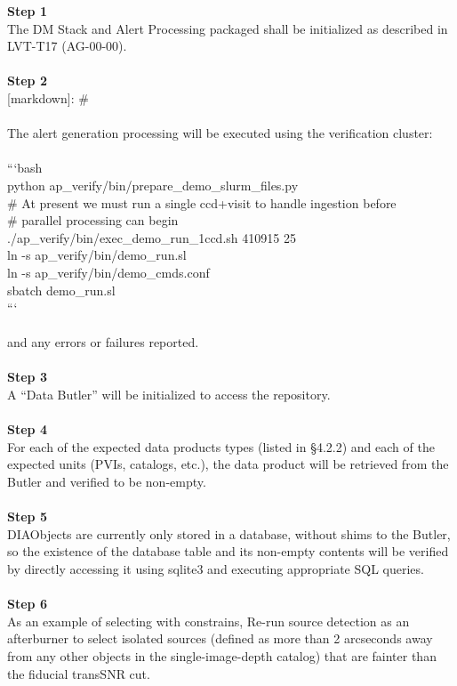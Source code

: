 \textbf{Step 1}\\
The DM Stack and Alert Processing packaged shall be initialized as
described in LVT-T17 (AG-00-00).\\
~\\
\textbf{Step 2}\\
{[}markdown{]}: \#\\
~\\
The alert generation processing will be executed using the verification
cluster:\\
~\\
```bash\\
python ap\_verify/bin/prepare\_demo\_slurm\_files.py\\
\# At present we must run a single ccd+visit to handle ingestion
before\\
\# parallel processing can begin\\
./ap\_verify/bin/exec\_demo\_run\_1ccd.sh 410915 25\\
ln -s ap\_verify/bin/demo\_run.sl\\
ln -s ap\_verify/bin/demo\_cmds.conf\\
sbatch demo\_run.sl\\
```\\
~\\
and any errors or failures reported.\\
~\\
\textbf{Step 3}\\
A ``Data Butler'' will be initialized to access the repository.\\
~\\
\textbf{Step 4}\\
For each of the expected data products types (listed in §4.2.2) and each
of the expected units (PVIs, catalogs, etc.), the data product will be
retrieved from the Butler and verified to be non-empty.\\
~\\
\textbf{Step 5}\\
DIAObjects are currently only stored in a database, without shims to the
Butler, so the existence of the database table and its non-empty
contents will be verified by directly accessing it using sqlite3 and
executing appropriate SQL queries.\\
~\\
\textbf{Step 6}\\
As an example of selecting with constrains, Re-run source detection as
an afterburner to select isolated sources (defined as more than 2
arcseconds away from any other objects in the single-image-depth
catalog) that are fainter than the fiducial transSNR cut.\\
~\\

